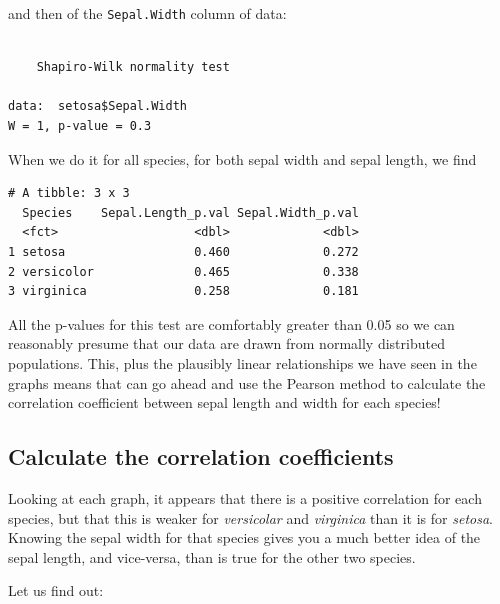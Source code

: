\documentclass[
  letterpaper,
  DIV=11,
  numbers=noendperiod]{scrreprt}
\newenvironment{Shaded}{\begin{snugshade}}{\end{snugshade}}
\newcommand{\FunctionTok}[1]{\textcolor[rgb]{0.28,0.35,0.67}{#1}}
\newcommand{\NormalTok}[1]{\textcolor[rgb]{0.00,0.23,0.31}{#1}}
\newcommand{\SpecialCharTok}[1]{\textcolor[rgb]{0.37,0.37,0.37}{#1}}
\begin{document}
and then of the \texttt{Sepal.Width} column of data:

\begin{Shaded}
\end{Shaded}

\begin{verbatim}

    Shapiro-Wilk normality test

data:  setosa$Sepal.Width
W = 1, p-value = 0.3
\end{verbatim}

When we do it for all species, for both sepal width and sepal length, we
find

\begin{verbatim}
# A tibble: 3 x 3
  Species    Sepal.Length_p.val Sepal.Width_p.val
  <fct>                   <dbl>             <dbl>
1 setosa                  0.460             0.272
2 versicolor              0.465             0.338
3 virginica               0.258             0.181
\end{verbatim}

All the p-values for this test are comfortably greater than 0.05 so we
can reasonably presume that our data are drawn from normally distributed
populations. This, plus the plausibly linear relationships we have seen
in the graphs means that can go ahead and use the Pearson method to
calculate the correlation coefficient between sepal length and width for
each species!

\subsection{Calculate the correlation
coefficients}\label{calculate-the-correlation-coefficients}

Looking at each graph, it appears that there is a positive correlation
for each species, but that this is weaker for \emph{versicolar} and
\emph{virginica} than it is for \emph{setosa}. Knowing the sepal width
for that species gives you a much better idea of the sepal length, and
vice-versa, than is true for the other two species.

Let us find out:
\end{document}

